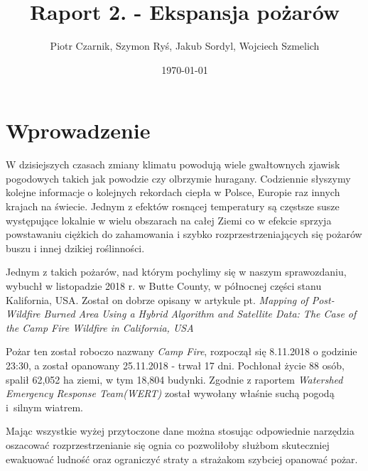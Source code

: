 \documentclass{article}
\title{Raport 2. - Ekspansja pożarów}
\author{Piotr Czarnik,
Szymon Ryś,
Jakub Sordyl,
Wojciech Szmelich}
\date{\today}
\begin{document}

\maketitle
\tableofcontents

  
\section{Wprowadzenie}
\label{chap:intro}

    W dzisiejszych czasach zmiany klimatu powodują wiele gwałtownych zjawisk pogodowych takich jak powodzie czy olbrzymie huragany. Codziennie słyszymy kolejne informacje o kolejnych rekordach ciepła w Polsce, Europie raz innych krajach na świecie. Jednym z efektów rosnącej temperatury są częstsze susze występujące lokalnie w wielu obszarach na całej Ziemi co w efekcie sprzyja powstawaniu ciężkich do zahamowania i szybko rozprzestrzeniających się pożarów buszu i innej dzikiej roślinności.

    Jednym z takich pożarów, nad którym pochylimy się w naszym sprawozdaniu, wybuchł w listopadzie 2018 r. w Butte County, w północnej części stanu Kalifornia, USA. Został on dobrze opisany w artykule pt. \textit{Mapping of Post-Wildfire Burned Area Using a Hybrid Algorithm and Satellite Data: The Case of the Camp Fire Wildfire in California, USA}~\cite{camp-fire-wildfire-in-california}

    Pożar ten został roboczo nazwany \textit{Camp Fire}, rozpoczął się 8.11.2018 o godzinie 23:30, a został opanowany 25.11.2018 - trwał 17 dni. Pochłonał życie 88 osób, spalił 62,052 ha ziemi, w tym 18,804 budynki. Zgodnie z raportem \textit{Watershed Emergency Response Team(WERT)} został wywołany właśnie suchą pogodą i~silnym wiatrem. %

    Mając wszystkie wyżej przytoczone dane można stosując odpowiednie narzędzia oszacować rozprzestrzenianie się ognia co pozwoliłoby służbom skuteczniej ewakuować ludność oraz ograniczyć straty a strażakom szybciej opanować pożar.
\end{document}
